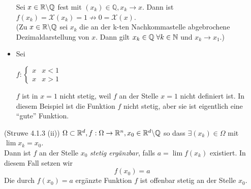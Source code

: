 \begin{itemize}
Sei $x\in\mathbb{R}\backslash\mathbb{Q}$ fest mit $(x_{k})\in\mathbb{Q}, x_{k}\to x$. Dann ist ${f(x_{k})=\mathcal{X}(x_{k})=1 \nrightarrow 0=\mathcal{X}(x)}$. \\
(Zu $x\in\mathbb{R}\backslash\mathbb{Q}$ sei $x_{k}$ die an der k-ten Nachkommastelle abgebrochene Dezimaldarstellung von $x$. Dann gilt $x_{k} \in \mathbb{Q}\; \forall k \in \mathbb{N}$ und $x_{k}\to x_{1}$.)
\item Sei
\begin{multicols}{2}
\begin{center}
\vspace*{\fill}
$f: \begin{cases} x &x < 1 \\x &x>1 \end{cases}$
\vspace*{\fill}
\end{center}
\columnbreak
\begin{center}
\end{center}
\end{multicols}

 $f$ ist in $x=1$ nicht stetig, weil $f$ an der Stelle $x=1$ nicht definiert ist. In diesem Beispiel ist die Funktion $f$ nicht stetig, aber sie ist eigentlich eine ``gute'' Funktion.

\end{itemize}
\begin{definition}{(Struwe 4.1.3 (ii))}
$\Omega \subset \mathbb{R}^{d}, f:\Omega\to\mathbb{R}^{n}, x_{0}\in\mathbb{R}^{d}\backslash\mathbb{Q}$ so dass $\exists (x_{k})\in\Omega$ mit $\lim{x_{k}=x_{0}}$. \\

Dann ist $f$ an der Stelle $x_{0}$ \emph{stetig ergänzbar}, falls $a=\lim{f(x_{k})}$ existiert. In diesem Fall setzen wir \[ f(x_{0}) = a\]
Die durch $f(x_{0})=a$ ergänzte Funktion $f$ ist offenbar stetig an der Stelle $x_{0}$.
\end{definition}

